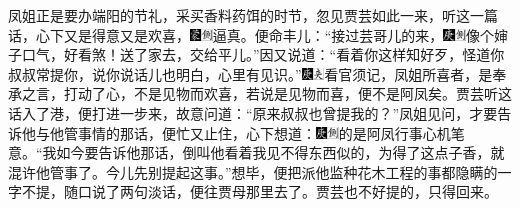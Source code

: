 凤姐正是要办端阳的节礼，采买香料药饵的时节，忽见贾芸如此一来，听这一篇话，心下又是得意又是欢喜，{\includegraphics[width=3mm]{../Images/00006}\includegraphics[width=3mm]{../Images/00011}\footnotesize \kaishu 逼真。}便命丰儿：“接过芸哥儿的来，{\includegraphics[width=3mm]{../Images/00004}\includegraphics[width=3mm]{../Images/00011}\footnotesize \kaishu 像个婶子口气，好看煞！}送了家去，交给平儿。”因又说道：“看着你这样知好歹，怪道你叔叔常提你，说你说话儿也明白，心里有见识。”{\includegraphics[width=3mm]{../Images/00004}\includegraphics[width=3mm]{../Images/00012}\footnotesize \kaishu 看官须记，凤姐所喜者，是奉承之言，打动了心，不是见物而欢喜，若说是见物而喜，便不是阿凤矣。}贾芸听这话入了港，便打进一步来，故意问道：“原来叔叔也曾提我的？”凤姐见问，才要告诉他与他管事情的那话，便忙又止住，心下想道：{\includegraphics[width=3mm]{../Images/00004}\includegraphics[width=3mm]{../Images/00011}\footnotesize \kaishu 的是阿凤行事心机笔意。}“我如今要告诉他那话，倒叫他看着我见不得东西似的，为得了这点子香，就混许他管事了。今儿先别提起这事。”想毕，便把派他监种花木工程的事都隐瞒的一字不提，随口说了两句淡话，便往贾母那里去了。贾芸也不好提的，只得回来。

